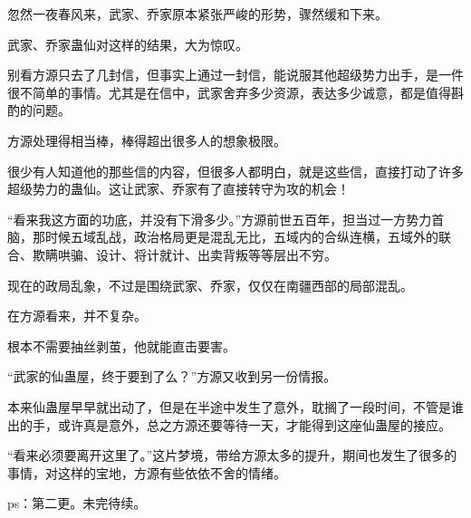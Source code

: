 \begin{this_body}
忽然一夜春风来，武家、乔家原本紧张严峻的形势，骤然缓和下来。

武家、乔家蛊仙对这样的结果，大为惊叹。

别看方源只去了几封信，但事实上通过一封信，能说服其他超级势力出手，是一件很不简单的事情。尤其是在信中，武家舍弃多少资源，表达多少诚意，都是值得斟酌的问题。

方源处理得相当棒，棒得超出很多人的想象极限。

很少有人知道他的那些信的内容，但很多人都明白，就是这些信，直接打动了许多超级势力的蛊仙。这让武家、乔家有了直接转守为攻的机会！

“看来我这方面的功底，并没有下滑多少。”方源前世五百年，担当过一方势力首脑，那时候五域乱战，政治格局更是混乱无比，五域内的合纵连横，五域外的联合、欺瞒哄骗、设计、将计就计、出卖背叛等等层出不穷。

现在的政局乱象，不过是围绕武家、乔家，仅仅在南疆西部的局部混乱。

在方源看来，并不复杂。

根本不需要抽丝剥茧，他就能直击要害。

“武家的仙蛊屋，终于要到了么？”方源又收到另一份情报。

本来仙蛊屋早早就出动了，但是在半途中发生了意外，耽搁了一段时间，不管是谁出的手，或许真是意外，总之方源还要等待一天，才能得到这座仙蛊屋的接应。

“看来必须要离开这里了。”这片梦境，带给方源太多的提升，期间也发生了很多的事情，对这样的宝地，方源有些依依不舍的情绪。

ps：第二更。未完待续。

\end{this_body}

